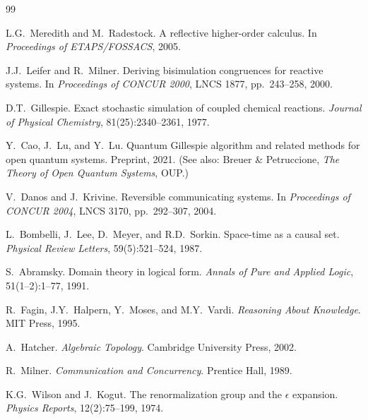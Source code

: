 
\begin{thebibliography}{99}

L.G.~Meredith and M.~Radestock. \newblock A reflective higher-order calculus. \newblock In \emph{Proceedings of ETAPS/FOSSACS}, 2005.

J.J.~Leifer and R.~Milner. \newblock Deriving bisimulation congruences for reactive systems. \newblock In \emph{Proceedings of CONCUR 2000}, LNCS 1877, pp.~243--258, 2000.

D.T.~Gillespie. \newblock Exact stochastic simulation of coupled chemical reactions. \newblock \emph{Journal of Physical Chemistry}, 81(25):2340--2361, 1977.

Y.~Cao, J.~Lu, and Y.~Lu. \newblock Quantum Gillespie algorithm and related methods for open quantum systems. \newblock Preprint, 2021. \newblock (See also: Breuer \& Petruccione, \emph{The Theory of Open Quantum Systems}, OUP.)

V.~Danos and J.~Krivine. \newblock Reversible communicating systems. \newblock In \emph{Proceedings of CONCUR 2004}, LNCS 3170, pp.~292--307, 2004.

L.~Bombelli, J.~Lee, D.~Meyer, and R.D.~Sorkin. \newblock Space-time as a causal set. \newblock \emph{Physical Review Letters}, 59(5):521--524, 1987. %

S.~Abramsky. \newblock Domain theory in logical form. \newblock \emph{Annals of Pure and Applied Logic}, 51(1--2):1--77, 1991.

R.~Fagin, J.Y.~Halpern, Y.~Moses, and M.Y.~Vardi. \newblock \emph{Reasoning About Knowledge}. \newblock MIT Press, 1995.

A.~Hatcher. \newblock \emph{Algebraic Topology}. \newblock Cambridge University Press, 2002.

R.~Milner. \newblock \emph{Communication and Concurrency}. \newblock Prentice Hall, 1989.

K.G.~Wilson and J.~Kogut. \newblock The renormalization group and the $\epsilon$ expansion. \newblock \emph{Physics Reports}, 12(2):75--199, 1974. %


\end{thebibliography}
